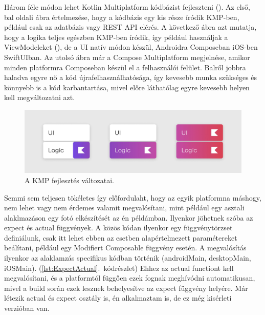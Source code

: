 Három féle módon lehet Kotlin Multiplatform kódbázist fejleszteni ().
Az első, bal oldali ábra értelmezése, hogy a kódbázis egy kis része íródik KMP-ben, például csak az adatbázis vagy REST API elérés.
A következő ábra azt mutatja, hogy a logika teljes egészben KMP-ben íródik, így például használjak a ViewModeleket (), de a UI natív módon készül, Androidra Composeban iOS-ben SwiftUIban.
Az utolsó ábra már a Compose Multiplatform megjelnése, amikor minden platformra Composeban készül el a felhasználói felület.
Balről jobbra haladva egyre nő a kód újrafelhasználhatósága, így kevesebb munka szükséges és könnyebb is a kód karbantartása, mivel előre láthatólag egyre kevesebb helyen kell megváltozatni azt.

\begin{figure}[!ht]
    \centering
    \includegraphics[width=150mm, keepaspectratio]{figures/KMP-types.png}
    \caption{A KMP fejlesztés változatai. \cite{KotlinMultiplatformStable}}
    \label{fig:KMPTypes}
\end{figure}

Semmi sem teljesen tökéletes így előfordulaht, hogy az egyik platformna máshogy, nem lehet vagy nem érdemes valamit megvalósítani, mint például egy asztali alaklmazáson egy fotó elkészítését az én példámban.
Ilyenkor jöhetnek szóba az expect és actual függvények. A közös kódan ilyenkor egy függvénytörzset definiálunk, csak itt lehet ebben az esetben alapértelmezett paramétereket beálítani, például egy Modifiert Composable függvény esetén.
A megvalósítás ilyenkor az alaklamzás specifikus kódban történik (androidMain, desktopMain, iOSMain). (\ref{lst:ExpectActual}.~kódrészlet)
Ehhez az actual functiont kell megvalósítani, és a platformtól függően ezek fognak meghívódni automatikusan, mivel a build során ezek lesznek behelyesítve az expect függvény helyére.
Már létezik actual és expect osztály is, én alkalmaztam is, de ez még kisérleti verzióban van.

